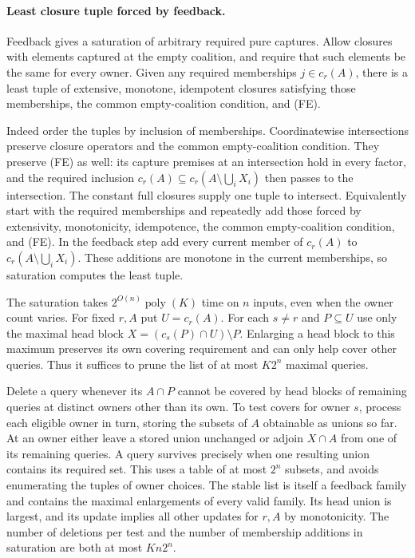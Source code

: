 \paragraph{Least closure tuple forced by feedback.}
Feedback gives a saturation of arbitrary required pure
captures. Allow closures with elements captured at the
empty coalition, and require that such elements be the
same for every owner. Given any required memberships
$j\in c_r(A)$, there is a least tuple of extensive,
monotone, idempotent closures satisfying those memberships,
the common empty-coalition condition, and (FE).

Indeed order the tuples by inclusion of memberships.
Coordinatewise intersections preserve closure operators
and the common empty-coalition condition. They preserve
(FE) as well: its capture premises at an intersection
hold in every factor, and the required inclusion
$c_r(A)\subseteq c_r(A\setminus\bigcup_iX_i)$ then
passes to the intersection. The constant full closures
supply one tuple to intersect. Equivalently start with
the required memberships and repeatedly add those forced
by extensivity, monotonicity, idempotence, the common
empty-coalition condition, and (FE). In the feedback step
add every current member of $c_r(A)$ to
$c_r(A\setminus\bigcup_iX_i)$. These additions are
monotone in the current memberships, so saturation
computes the least tuple.

The saturation takes $2^{O(n)}\operatorname{poly}(K)$
time on $n$ inputs, even when the owner count varies.
For fixed $r,A$ put $U=c_r(A)$. For each $s\ne r$ and
$P\subseteq U$ use only the maximal head block
$X=(c_s(P)\cap U)\setminus P$. Enlarging a head block
to this maximum preserves its own covering requirement
and can only help cover other queries. Thus it suffices
to prune the list of at most $K2^n$ maximal queries.

Delete a query whenever its $A\cap P$ cannot be covered
by head blocks of remaining queries at distinct owners
other than its own. To test covers for owner $s$, process
each eligible owner in turn, storing the subsets of $A$
obtainable as unions so far. At an owner either leave a
stored union unchanged or adjoin $X\cap A$ from one of
its remaining queries. A query survives precisely when
one resulting union contains its required set. This
uses a table of at most $2^n$ subsets, and avoids
enumerating the tuples of owner choices. The stable
list is itself a feedback family and contains the
maximal enlargements of every valid family. Its head
union is largest, and its update implies all other
updates for $r,A$ by monotonicity. The number of
deletions per test and the number of membership additions
in saturation are both at most $K n2^n$.

